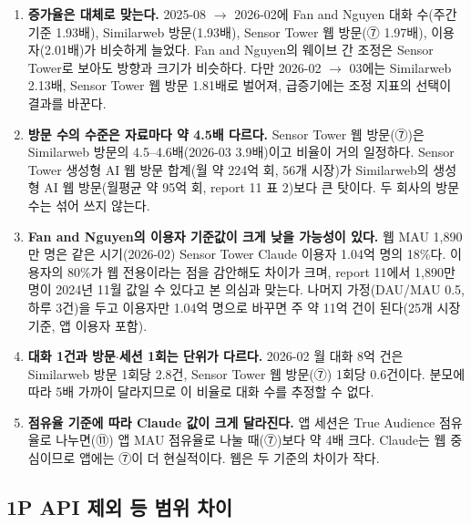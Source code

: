 \documentclass[11pt]{article}
\begin{document}
\begin{enumerate}[label=(\arabic*)]
  \item \textbf{증가율은 대체로 맞는다.} 2025-08 $\to$ 2026-02에 Fan and Nguyen 대화 수(주간 기준 1.93배), Similarweb 방문(1.93배), Sensor Tower 웹 방문(⑦ 1.97배), 이용자(2.01배)가 비슷하게 늘었다. Fan and Nguyen의 웨이브 간 조정은 Sensor Tower로 보아도 방향과 크기가 비슷하다. 다만 2026-02 $\to$ 03에는 Similarweb 2.13배, Sensor Tower 웹 방문 1.81배로 벌어져, 급증기에는 조정 지표의 선택이 결과를 바꾼다.
  \item \textbf{방문 수의 수준은 자료마다 약 4.5배 다르다.} Sensor Tower 웹 방문(⑦)은 Similarweb 방문의 4.5--4.6배(2026-03 3.9배)이고 비율이 거의 일정하다. Sensor Tower 생성형 AI 웹 방문 합계(월 약 224억 회, 56개 시장)가 Similarweb의 생성형 AI 웹 방문(월평균 약 95억 회, report 11 표 2)보다 큰 탓이다. 두 회사의 방문 수는 섞어 쓰지 않는다.
  \item \textbf{Fan and Nguyen의 이용자 기준값이 크게 낮을 가능성이 있다.} 웹 MAU 1,890만 명은 같은 시기(2026-02) Sensor Tower Claude 이용자 1.04억 명의 18\%다. 이용자의 80\%가 웹 전용이라는 점을 감안해도 차이가 크며, report 11에서 1,890만 명이 2024년 11월 값일 수 있다고 본 의심과 맞는다. 나머지 가정(DAU/MAU 0.5, 하루 3건)을 두고 이용자만 1.04억 명으로 바꾸면 주 약 11억 건이 된다(25개 시장 기준, 앱 이용자 포함).
  \item \textbf{대화 1건과 방문$\cdot$세션 1회는 단위가 다르다.} 2026-02 월 대화 8억 건은 Similarweb 방문 1회당 2.8건, Sensor Tower 웹 방문(⑦) 1회당 0.6건이다. 분모에 따라 5배 가까이 달라지므로 이 비율로 대화 수를 추정할 수 없다.
  \item \textbf{점유율 기준에 따라 Claude 값이 크게 달라진다.} 앱 세션은 True Audience 점유율로 나누면(⑪) 앱 MAU 점유율로 나눌 때(⑦)보다 약 4배 크다. Claude는 웹 중심이므로 앱에는 ⑦이 더 현실적이다. 웹은 두 기준의 차이가 작다.
\end{enumerate}

\subsection{1P API 제외 등 범위 차이}
\end{document}
